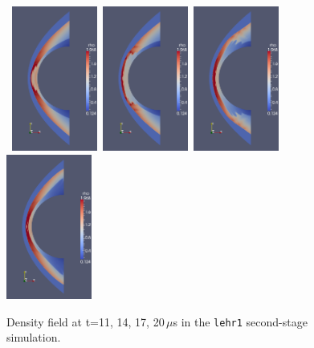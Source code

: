 \begin{figure}[htbp]
\begin{center}
\mbox{
\includegraphics[width=0.25\textwidth]{../2D/lehr-479/lehr1-density-field-200x300-frame-11.png}
\includegraphics[width=0.25\textwidth]{../2D/lehr-479/lehr1-density-field-200x300-frame-14.png}
\includegraphics[width=0.25\textwidth]{../2D/lehr-479/lehr1-density-field-200x300-frame-17.png}
\includegraphics[width=0.25\textwidth]{../2D/lehr-479/lehr1-density-field-200x300-frame-20.png}
}
\end{center}
\caption{Density field at t=11, 14, 17, 20\,$\mu$s in the \texttt{lehr1} second-stage simulation.}
\label{lehr-density-field-fig}
\end{figure}


